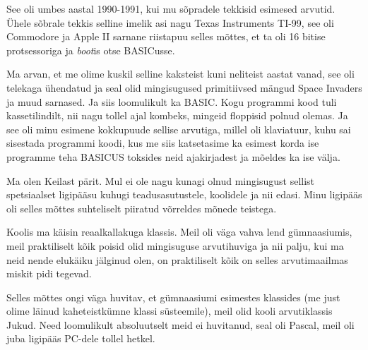 See oli umbes aastal 1990-1991, kui mu sõpradele tekkisid esimesed arvutid. Ühele sõbrale tekkis selline imelik asi nagu Texas Instruments TI-99, see oli Commodore ja Apple II sarnane riistapuu selles mõttes, et ta oli 16 bitise protsessoriga ja \emph{boot}is otse BASICusse. 

Ma arvan, et me olime kuskil selline kaksteist kuni neliteist aastat vanad, see oli telekaga ühendatud ja seal olid mingisugused primitiivsed mängud Space Invaders ja muud sarnased. Ja siis loomulikult ka BASIC. Kogu programmi kood tuli kassetilindilt, nii nagu tollel ajal kombeks, mingeid floppisid polnud olemas. Ja see oli minu esimene kokkupuude sellise arvutiga, millel oli klaviatuur, kuhu sai sisestada programmi koodi, kus me siis katsetasime ka esimest korda ise programme teha BASICUS toksides neid ajakirjadest ja mõeldes ka ise välja. 


Ma olen Keilast pärit. Mul ei ole nagu kunagi olnud mingisugust sellist spetsiaalset ligipääsu kuhugi  teadusasutustele, koolidele ja nii edasi. Minu ligipääs oli selles mõttes suhteliselt  piiratud võrreldes mõnede teistega.


Koolis ma käisin reaalkallakuga klassis. Meil oli väga vahva lend gümnaasiumis, meil praktiliselt kõik poisid olid mingisuguse arvutihuviga ja nii palju, kui ma neid nende elukäiku jälginud olen, on praktiliselt kõik on selles arvutimaailmas miskit pidi tegevad.


Selles mõttes ongi väga huvitav, et gümnaasiumi esimestes klassides (me just olime läinud kaheteistkümne klassi süsteemile), meil olid kooli arvutiklassis  Jukud. Need loomulikult absoluutselt meid ei huvitanud, seal oli Pascal, meil oli juba ligipääs PC-dele tollel hetkel. 

